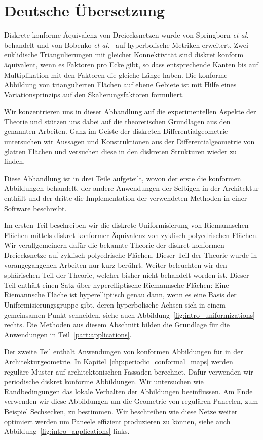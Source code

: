 \documentclass[Thesis.tex]{subfiles}
\begin{document}
\section*{Deutsche \"{U}bersetzung}
Diskrete konforme \"{A}quivalenz von Dreiecksnetzen wurde von Springborn {\it et al.}~\cite{Springborn2008} behandelt und von Bobenko {\it et al.}~\cite{BPS2015:dconf} auf hyperbolische Metriken erweitert.
Zwei euklidische Triangulierungen mit gleicher Konnektivit\"{a}t sind diskret konform \"{a}quivalent, wenn es  Faktoren pro Ecke gibt, so dass entsprechende Kanten bis auf Multiplikation mit den Faktoren die gleiche L\"{a}nge haben.
Die konforme Abbildung von triangulierten Fl\"{a}chen auf ebene Gebiete ist mit Hilfe eines Variationsprinzips auf den Skalierungsfaktoren formuliert.

Wir konzentrieren uns in dieser Abhandlung auf die experimentellen Aspekte der Theorie und st\"{u}tzen uns dabei auf die theoretischen Grundlagen aus den genannten Arbeiten.
Ganz im Geiste der diskreten Differentialgeometrie untersuchen wir Aussagen und Konstruktionen aus der Differentialgeometrie von glatten Fl\"{a}chen und versuchen diese in den diskreten Strukturen wieder zu finden.

Diese Abhandlung ist in drei Teile aufgeteilt, wovon der erste die konformen Abbildungen behandelt, der andere Anwendungen der Selbigen in der Architektur enth\"{a}lt und der dritte die Implementation der verwendeten Methoden in einer Software beschreibt.

Im ersten Teil beschreiben wir die diskrete Uniformisierung von Riemannschen Fl\"{a}chen mittels diskret konformer \"{A}quivalenz von zyklisch polyedrischen Fl\"{a}chen.
Wir verallgemeinern daf\"{u}r die bekannte Theorie der diskret konformen Dreiecksnetze auf zyklisch polyedrische Fl\"{a}chen.
Dieser Teil der Theorie wurde in vorangegangenen Arbeiten nur kurz ber\"{u}hrt.
Weiter beleuchten wir den sph\"{a}rischen Teil der Theorie, welcher bisher nicht behandelt worden ist.
Dieser Teil enth\"{a}lt einen Satz \"{u}ber hyperelliptische Riemannsche Fl\"{a}chen: 
Eine Riemannsche Fl\"{a}che ist hyperelliptisch genau dann, wenn es eine Basis der Uniformisierungsgruppe gibt, deren hyperbolische Achsen sich in einem gemeinsamen Punkt schneiden, siehe auch Abbildung~\ref{fig:intro_uniformizations} rechts.
Die Methoden aus diesem Abschnitt bilden die Grundlage f\"{u}r die Anwendungen in Teil~\ref{part:applications}.

Der zweite Teil enth\"{a}lt Anwendungen von konformen Abbildungen f\"{u}r in der Architekturgeometrie.
In Kapitel~\ref{chp:periodic_conformal_maps} werden regul\"{a}re Muster auf architektonischen Fassaden berechnet.
Daf\"{u}r verwenden wir periodische diskret konforme Abbildungen.
Wir untersuchen wie Randbedingungen das lokale Verhalten der Abbildungen beeinflussen.
Am Ende verwenden wir diese Abbildungen um die Geometrie von regul\"{a}ren Paneelen, zum Beispiel Sechsecken, zu bestimmen. 
Wir beschreiben wie diese Netze weiter optimiert werden um Paneele effizient produzieren zu k\"{o}nnen, siehe auch Abbildung~\ref{fig:intro_applications} links.
\end{document}
